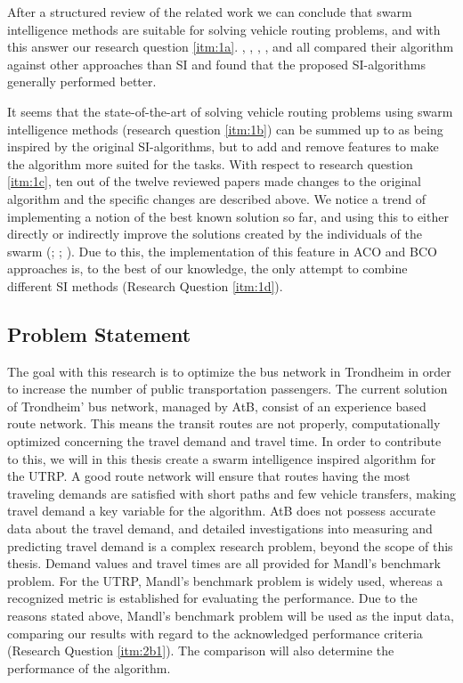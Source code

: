 After a structured review of the related work we can conclude that swarm intelligence methods are suitable for solving vehicle routing problems, and with this answer our research question \vref{itm:1a}. \citet{tripathi09}, \citet{dias14}, \citet{poorzahedy11}, \citet{nikolic14}, and \citet{kechagiopoulos14} all compared their algorithm against other approaches than SI and found that the proposed SI-algorithms generally performed better.

It seems that the state-of-the-art of solving vehicle routing problems using swarm intelligence methods (research question \vref{itm:1b}) can be summed up to as being inspired by the original SI-algorithms, but to add and remove features to make the algorithm more suited for the tasks. With respect to research question \vref{itm:1c}, ten out of the twelve reviewed papers made changes to the original algorithm and the specific changes are described above. We notice a trend of implementing a notion of the best known solution so far, and using this to either directly or indirectly improve the solutions created by the individuals of the swarm (\citet{tripathi09}; \citet{sedighpour14}; \citet{nikolic14}). Due to this, the implementation of this feature in ACO and BCO approaches is, to the best of our knowledge, the only attempt to combine different SI methods (Research Question \vref{itm:1d}). 

\subsection{Problem Statement}
\label{sec:problemStatement}

The goal with this research is to optimize the bus network in Trondheim in order to increase the number of public transportation passengers. The current solution of Trondheim' bus network, managed by AtB\citep{website:atb}, consist of an experience based route network. This means the transit routes are not properly, computationally optimized concerning the travel demand and travel time. In order to contribute to this, we will in this thesis create a swarm intelligence inspired algorithm for the UTRP. A good route network will ensure that routes having the most traveling demands are satisfied with short paths and few vehicle transfers, making travel demand a key variable for the algorithm. AtB does not possess accurate data about the travel demand, and detailed investigations into measuring and predicting travel demand is a complex research problem, beyond the scope of this thesis. Demand values and travel times are all provided for Mandl's benchmark problem\citep{mandl79}. For the UTRP, Mandl's benchmark problem is widely used, whereas a recognized metric is established for evaluating the performance. Due to the reasons stated above, Mandl's benchmark problem will be used as the input data, comparing our results with regard to the acknowledged performance criteria\citep{nikolic14,kechagiopoulos14} (Research Question \vref{itm:2b1}). The comparison will also determine the performance of the algorithm. 

